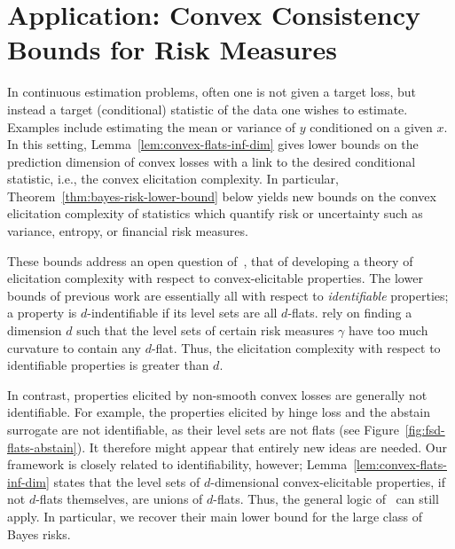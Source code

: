 \documentclass[11pt]{article} %
\newcommand{\Comments}{1}
\newcommand{\mytodo}[2]{\ifnum\Comments=1%
	\todo[linecolor=#1!80!black,backgroundcolor=#1,bordercolor=#1!80!black]{#2}\fi}
\newcommand{\btw}[1]{}%
\newcommand{\Y}{\mathcal{Y}}
\newcommand{\ones}{\mathbbm{1}}
\begin{document}
\section{Application: Convex Consistency Bounds for Risk Measures}\label{sec:contin-consis}

In continuous estimation problems, often one is not given a target loss, but instead a target (conditional) statistic of the data one wishes to estimate.
Examples include estimating the mean or variance of $y$ conditioned on a given $x$.
In this setting, Lemma~\ref{lem:convex-flats-inf-dim} gives lower bounds on the prediction dimension of convex losses with a link to the desired conditional statistic, i.e., the convex elicitation complexity.
In particular,
Theorem~\ref{thm:bayes-risk-lower-bound} below yields new bounds on the convex elicitation complexity of statistics which quantify risk or uncertainty such as variance, entropy, or financial risk measures.

These bounds address an open question of~\citet{frongillo2020elicitation}, that of developing a theory of elicitation complexity with respect to convex-elicitable properties.
The lower bounds of previous work are essentially all with respect to \emph{identifiable} properties;
a property is $d$-indentifiable if its level sets are all $d$-flats.
\citet{frongillo2020elicitation} rely on finding a dimension $d$ such that the level sets of certain risk measures $\gamma$ have too much curvature to contain any $d$-flat.
Thus, the elicitation complexity with respect to identifiable properties is greater than $d$.

In contrast, properties elicited by non-smooth convex losses are generally not identifiable.
For example, the properties elicited by hinge loss and the abstain surrogate are not identifiable, as their level sets are not flats (see Figure~\ref{fig:fsd-flats-abstain}).
It therefore might appear that entirely new ideas are needed.
Our framework is closely related to identifiability, however; Lemma~\ref{lem:convex-flats-inf-dim} states that the level sets of $d$-dimensional convex-elicitable properties, if not $d$-flats themselves, are unions of $d$-flats.
Thus, the general logic of~\citet{frongillo2020elicitation} can still apply.
In particular, we recover their main lower bound for the large class of Bayes risks.
\btw{Old version for finite $\Y$ is in the NeurIPS 2020 submission; especially lots more detail on variance / norm / entropy examples}
\end{document}
